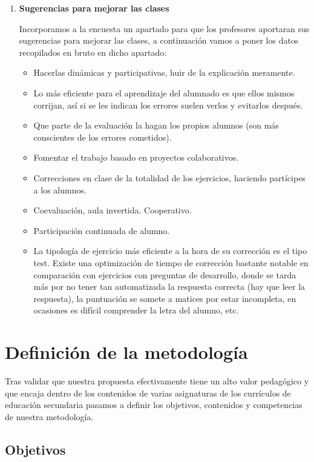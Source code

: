 \begin{enumerate}
\item \textbf{Sugerencias para mejorar las clases}

Incorporamos a la encuesta un apartado para que los profesores aportaran sus sugerencias para mejorar las clases, a continuación vamos a poner los datos recopilados en bruto en dicho apartado:

\begin{itemize}
    \item Hacerlas dinámicas y participativas, huir de la explicación meramente.
    \item Lo más eficiente para el aprendizaje del alumnado es que ellos mismos corrijan, así si se les indican los errores suelen verlos y evitarlos después.
    \item Que parte de la evaluación la hagan los propios alumnos (son más conscientes de los errores cometidos).
    \item Fomentar el trabajo basado en proyectos colaborativos.
    \item Correcciones en clase de la totalidad de los ejercicios, haciendo partícipes a los alumnos.
    \item Coevaluación, aula invertida. Cooperativo.
    \item Participación continuada de alumno.
    \item La tipología de ejercicio más eficiente a la hora de su corrección es el tipo test. Existe una optimización de tiempo de corrección bastante notable en comparación con ejercicios con preguntas de desarrollo, donde se tarda más por no tener tan automatizada la respuesta correcta (hay que leer la respuesta), la puntuación se somete a matices por estar incompleta, en ocasiones es difícil comprender la letra del alumno, etc.
\end{itemize}


\end{enumerate}

\section{Definición de la metodología}

Tras validar que nuestra propuesta efectivamente tiene un alto valor pedagógico y que encaja dentro de los contenidos de varias asignaturas de los currículos de educación secundaria pasamos a definir los objetivos, contenidos y competencias de nuestra metodología.

\subsection{Objetivos}


